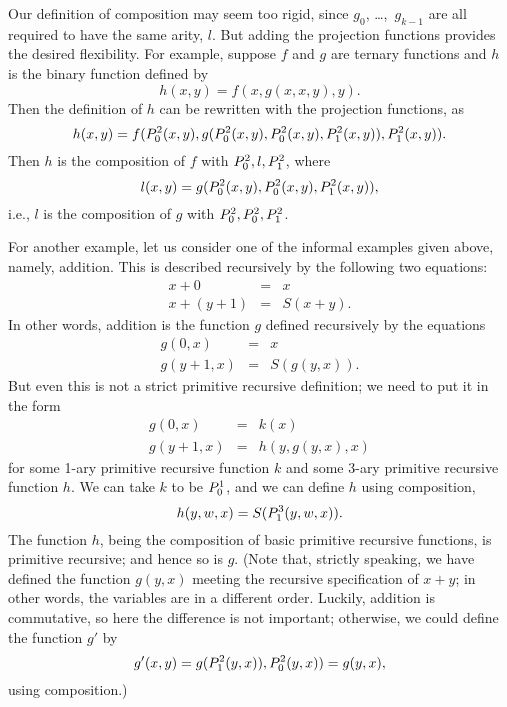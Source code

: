 \documentclass[../../include/open-logic-section]{subfiles}
\begin{document}
Our definition of composition may seem too rigid, since
$g_0$, \dots,~$g_{k-1}$ are all required to have the same arity, $l$. But
adding the projection functions provides the desired flexibility. For
example, suppose $f$ and $g$ are ternary functions and $h$ is the
binary function defined by
\[
h(x,y) = f(x,g(x,x,y),y).
\]
Then the definition of $h$ can be rewritten with the projection
functions, as
\[
h(x,y) = f(P^{2}_{0}(x,y), g(P^{2}_{0}(x,y), P^{2}_{0}(x,y),
P^{2}_{1}(x,y)), P^{2}_{1}(x,y)).
\]
Then $h$ is the composition of $f$ with $P^{2}_{0},l,P^{2}_{1}$, where
\[
l(x,y) = g(P^{2}_{0}(x,y),P^{2}_{0}(x,y),P^{2}_{1}(x,y)),
\]
i.e., $l$ is the composition of $g$ with $P^{2}_{0},P^{2}_{0},P^{2}_{1}$.

For another example, let us consider one of the informal examples
given above, namely, addition. This is
described recursively by the following two equations:
\begin{eqnarray*}
x + 0 & = & x \\
x + (y+1) & = & S(x+y).
\end{eqnarray*}
In other words, addition is the function $g$ defined recursively by
the equations
\begin{eqnarray*}
g(0,x) & = & x \\
g(y+1,x) & = & S(g(y,x)).
\end{eqnarray*}
But even this is not a strict primitive recursive definition; we need
to put it in the form
\begin{eqnarray*}
g(0,x) & = & k(x) \\
g(y+1,x) & = & h(y,g(y,x),x)
\end{eqnarray*}
for some 1-ary primitive recursive function $k$ and some 3-ary
primitive recursive function $h$. We can take $k$ to be $P^{1}_{0}$, and
we can define $h$ using composition,
\[
h(y,w,x) = S(P^{3}_{1}(y,w,x)).
\]
The function $h$, being the composition of basic primitive recursive
functions, is primitive recursive; and hence so is $g$. (Note that,
strictly speaking, we have defined the function $g(y,x)$ meeting the
recursive specification of $x + y$; in other words, the variables are
in a different order. Luckily, addition is commutative, so here the
difference is not important; otherwise, we could define the function
$g'$ by
\[
g'(x,y) = g(P^{2}_{1}(y,x)),P^{2}_{0}(y,x)) = g(y,x),
\]
using composition.)
\end{document}
